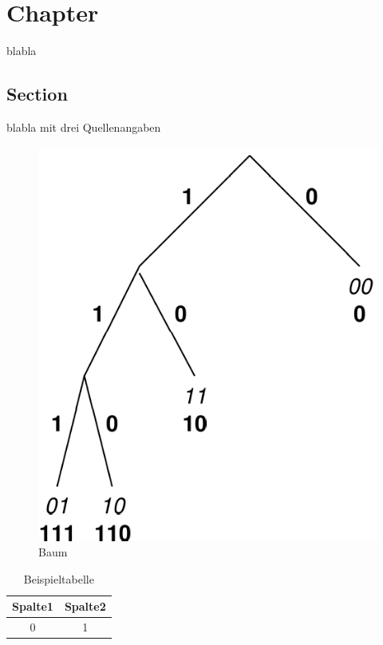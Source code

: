 
\section{Chapter}

blabla

\subsection{Section}

blabla mit drei Quellenangaben\cite{ietf-ipfix-protocol,snoeren2001hash,belenky2003ip}

\begin{figure}[h]%
 	\begin{center}%
 		\includegraphics[scale=0.1]{figure1.png}%
 		\caption{Baum}\label{fig:baum}%
 	\end{center}%
\end{figure}

\begin{table}[h]%
 	\begin{center}%
		\caption{Beispieltabelle}\label{tab:example}%
	 	\begin{tabular}{c|c}%
 			Spalte1 & Spalte2\\
 			\hline
 			0 & 1\\
 		\end{tabular}%
 	\end{center}%
\end{table}
